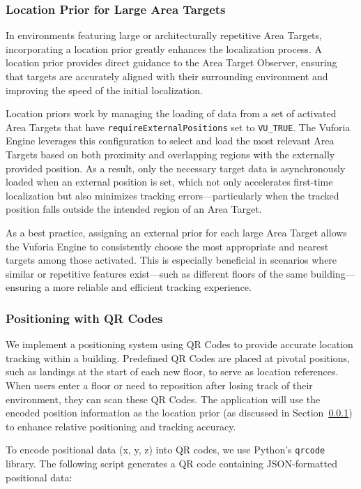 \subsubsection{Location Prior for Large Area Targets}\label{subsub:LocationPrior}
In environments featuring large or architecturally repetitive Area Targets, incorporating a location prior greatly enhances the localization process. A location prior provides direct guidance to the Area Target Observer, ensuring that targets are accurately aligned with their surrounding environment and improving the speed of the initial localization.

Location priors work by managing the loading of data from a set of activated Area Targets that have \texttt{requireExternalPositions} set to \texttt{VU\_TRUE}. The Vuforia Engine leverages this configuration to select and load the most relevant Area Targets based on both proximity and overlapping regions with the externally provided position. As a result, only the necessary target data is asynchronously loaded when an external position is set, which not only accelerates first-time localization but also minimizes tracking errors—particularly when the tracked position falls outside the intended region of an Area Target.

As a best practice, assigning an external prior for each large Area Target allows the Vuforia Engine to consistently choose the most appropriate and nearest targets among those activated. This is especially beneficial in scenarios where similar or repetitive features exist—such as different floors of the same building—ensuring a more reliable and efficient tracking experience.

\subsubsection{Positioning with QR Codes}
We implement a positioning system using QR Codes to provide accurate location tracking within a building. Predefined QR Codes are placed at pivotal positions, such as landings at the start of each new floor, to serve as location references. When users enter a floor or need to reposition after losing track of their environment, they can scan these QR Codes. The application will use the encoded position information as the location prior (as discussed in Section~\ref{subsub:LocationPrior}) to enhance relative positioning and tracking accuracy.

To encode positional data (x, y, z) into QR codes, we use Python's \texttt{qrcode} library. The following script generates a QR code containing JSON-formatted positional data:

